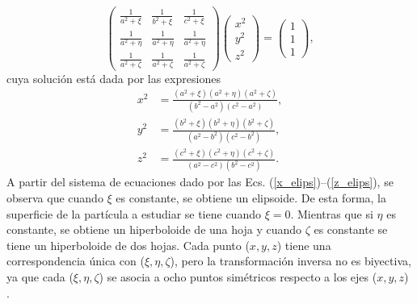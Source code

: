 	\begin{equation*}
		\begin{pmatrix}
			\frac{1}{a^2+\xi} & \frac{1}{b^2+\xi} & \frac{1}{c^2+\xi}\\
			\frac{1}{a^2+\eta} & \frac{1}{a^2+\eta} & \frac{1}{a^2+\eta}\\
			\frac{1}{a^2+\zeta} & \frac{1}{a^2+\zeta} & \frac{1}{a^2+\zeta}\end{pmatrix}\begin{pmatrix}
			x^2\\
			y^2\\
			z^2
		\end{pmatrix}=\begin{pmatrix}
			1\\
			1\\
			1
		\end{pmatrix},
	\end{equation*}
%	
cuya solución está dada por las expresiones
\begin{align}
	x^2&=\frac{(a^2+\xi)(a^2+\eta)(a^2+\zeta)}{(b^2-a^2)(c^2-a^2)},\label{x_elips}\\
	y^2&=\frac{(b^2+\xi)(b^2+\eta)(b^2+\zeta)}{(a^2-b^2)(c^2-b^2)},\label{y_elips}\\
	z^2&=\frac{(c^2+\xi)(c^2+\eta)(c^2+\zeta)}{(a^2-c^2)(b^2-c^2)}. \label{z_elips}    
\end{align}
A partir del sistema de ecuaciones dado por las Ecs. (\ref{x_elips})--(\ref{z_elips}), se observa que cuando $\xi$ es constante, se obtiene un elipsoide. De esta forma, la superficie de la partícula a estudiar se tiene cuando $\xi=0$. Mientras que si $\eta$ es constante, se obtiene un hiperboloide de una hoja y cuando $\zeta$ es constante se tiene un hiperboloide de dos hojas. Cada punto ($x,y,z$) tiene una correspondencia única con ($\xi,\eta,\zeta$), pero la transformación inversa no es biyectiva, ya que cada ($\xi,\eta,\zeta$) se asocia a ocho puntos simétricos respecto a los ejes ($x,y,z$) \cite{Cambdrige}. \\

